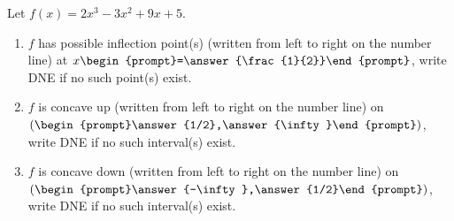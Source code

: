 \documentclass{ximera}
\author{Gregory Hartman \and Matthew Carr}
\begin{document}
\begin{exercise}




Let $f(x)=2x^3-3x^2+9x+5$. 
\begin{enumerate}
\item		$f$ has possible inflection point(s) (written from left to right on the number line) at $x\begin{prompt}=\answer{\frac{1}{2}}\end{prompt}$, write DNE if no such point(s) exist.
\item		$f$ is concave up (written from left to right on the number line) on $(\begin{prompt}\answer{1/2},\answer{\infty}\end{prompt})$, write DNE if no such interval(s) exist.
\item		$f$ is concave down (written from left to right on the number line) on $(\begin{prompt}\answer{-\infty},\answer{1/2}\end{prompt})$, write DNE if no such interval(s) exist.
\end{enumerate}

\end{exercise}
\end{document}
